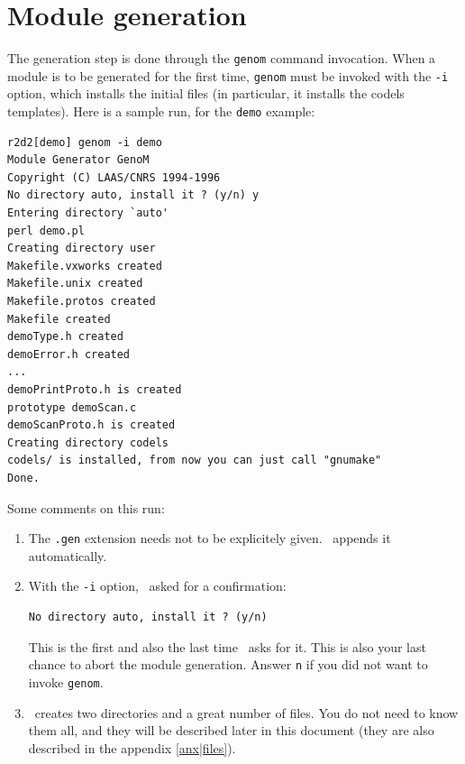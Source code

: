 \section{Module generation}
\label{sec|session|generate}

The  generation step is done  through the {\tt genom} command invocation.
When a module is to be generated for the  first time, {\tt genom} must be
invoked  with the {\tt  -i} option, which installs  the initial files (in
particular, it installs the codels templates).  Here is a sample run, for
the {\tt demo} example:

\begin{center}
\begin{cartouche}\small
\begin{verbatim}
r2d2[demo] genom -i demo
Module Generator GenoM
Copyright (C) LAAS/CNRS 1994-1996
No directory auto, install it ? (y/n) y
Entering directory `auto'
perl demo.pl
Creating directory user
Makefile.vxworks created
Makefile.unix created
Makefile.protos created
Makefile created
demoType.h created
demoError.h created
...
demoPrintProto.h is created
prototype demoScan.c
demoScanProto.h is created
Creating directory codels
codels/ is installed, from now you can just call "gnumake"
Done.
\end{verbatim}
\end{cartouche}
\end{center}

\bigbreak

Some comments on this run:

\begin{enumerate}
   \item  The {\tt   .gen}  extension   needs   not  to be    explicitely
   given. \GenoM\ appends it automatically.

   \item With the {\tt -i} option, \GenoM\ asked for a confirmation:
\begin{verbatim}
No directory auto, install it ? (y/n)
\end{verbatim}

   This is the first and also the last time  \GenoM\ asks for it. This is
   also your  last chance to abort the  module generation. Answer {\tt n}
   if you did not want to invoke {\tt genom}.

   \item \GenoM\ creates two directories and a great number of files. You
   do not need to know them all, and they will be described later in this
   document (they are also described in the appendix \ref{anx|files}).
\end{enumerate}

